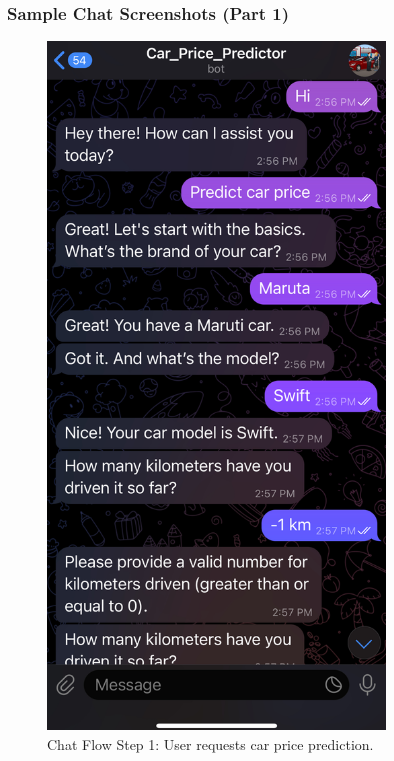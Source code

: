 \documentclass{beamer}
\begin{document}
\begin{frame}
\frametitle{Sample Chat Screenshots (Part 1)}

\begin{figure}[h!]
    \begin{minipage}{0.45\textwidth}
        \centering
        \includegraphics[width=0.8\textwidth]{1.jpg}
        \caption{Chat Flow Step 1: User requests car price prediction.}
        \label{fig:step1}
    \end{minipage}%
    \hspace{0.05\textwidth} %
    \begin{minipage}{0.45\textwidth}

\end{minipage}
\end{figure}
\end{frame}
\end{document}
